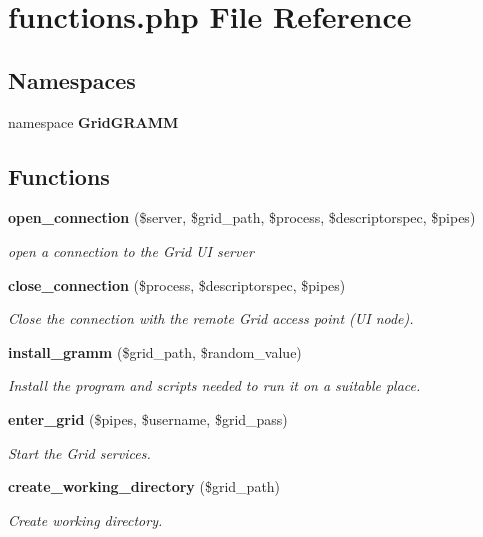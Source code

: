 \section{functions.php File Reference}
\label{functions_8php}
\subsection*{Namespaces}
\begin{CompactItemize}
\item 
namespace {\bf Grid\-GRAMM}
\end{CompactItemize}
\subsection*{Functions}
\begin{CompactItemize}
\item 
{\bf open\_\-connection} (\$server, \$grid\_\-path, \$process, \$descriptorspec, \$pipes)
\begin{CompactList}\small\item\em open a connection to the Grid UI server \item\end{CompactList}\item 
{\bf close\_\-connection} (\$process, \$descriptorspec, \$pipes)
\begin{CompactList}\small\item\em Close the connection with the remote Grid access point (UI node). \item\end{CompactList}\item 
{\bf install\_\-gramm} (\$grid\_\-path, \$random\_\-value)
\begin{CompactList}\small\item\em Install the program and scripts needed to run it on a suitable place. \item\end{CompactList}\item 
{\bf enter\_\-grid} (\$pipes, \$username, \$grid\_\-pass)
\begin{CompactList}\small\item\em Start the Grid services. \item\end{CompactList}\item 
{\bf create\_\-working\_\-directory} (\$grid\_\-path)
\begin{CompactList}\small\item\em Create working directory. \item\end{CompactList}\item 

\end{CompactItemize}
